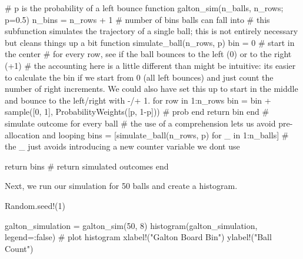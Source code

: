 \documentclass[
  letterpaper,
  DIV=11,
  numbers=noendperiod]{scrartcl}
\newenvironment{Shaded}{\begin{snugshade}}{\end{snugshade}}
\newcommand{\BuiltInTok}[1]{\textcolor[rgb]{0.00,0.23,0.31}{#1}}
\newcommand{\CommentTok}[1]{\textcolor[rgb]{0.37,0.37,0.37}{#1}}
\newcommand{\ConstantTok}[1]{\textcolor[rgb]{0.56,0.35,0.01}{#1}}
\newcommand{\ControlFlowTok}[1]{\textcolor[rgb]{0.00,0.23,0.31}{#1}}
\newcommand{\FloatTok}[1]{\textcolor[rgb]{0.68,0.00,0.00}{#1}}
\newcommand{\FunctionTok}[1]{\textcolor[rgb]{0.28,0.35,0.67}{#1}}
\newcommand{\KeywordTok}[1]{\textcolor[rgb]{0.00,0.23,0.31}{#1}}
\newcommand{\NormalTok}[1]{\textcolor[rgb]{0.00,0.23,0.31}{#1}}
\newcommand{\OperatorTok}[1]{\textcolor[rgb]{0.37,0.37,0.37}{#1}}
\newcommand{\StringTok}[1]{\textcolor[rgb]{0.13,0.47,0.30}{#1}}
\begin{document}
\begin{Shaded}
\begin{Highlighting}[]
\CommentTok{\# p is the probability of a left bounce}
\KeywordTok{function} \FunctionTok{galton\_sim}\NormalTok{(n\_balls, n\_rows; p}\OperatorTok{=}\FloatTok{0.5}\NormalTok{)}
\NormalTok{    n\_bins }\OperatorTok{=}\NormalTok{ n\_rows }\OperatorTok{+} \FloatTok{1} \CommentTok{\# number of bins balls can fall into}
    \CommentTok{\# this subfunction simulates the trajectory of a single ball; this is not entirely necessary but cleans things up a bit}
    \KeywordTok{function} \FunctionTok{simulate\_ball}\NormalTok{(n\_rows, p)}
\NormalTok{        bin }\OperatorTok{=} \FloatTok{0} \CommentTok{\# start in the center}
        \CommentTok{\# for every row, see if the ball bounces to the left (0) or to the right (+1)}
        \CommentTok{\# the accounting here is a little different than might be intuitive: it\textquotesingle{}s easier to calculate the bin if we start from 0 (all left bounces) and just count the number of right increments. We could also have set this up to start in the middle and bounce to the left/right with {-}/+ 1.}
        \ControlFlowTok{for}\NormalTok{ row }\KeywordTok{in} \FloatTok{1}\OperatorTok{:}\NormalTok{n\_rows}
\NormalTok{            bin }\OperatorTok{=}\NormalTok{ bin }\OperatorTok{+} \FunctionTok{sample}\NormalTok{([}\FloatTok{0}\NormalTok{, }\FloatTok{1}\NormalTok{], }\FunctionTok{ProbabilityWeights}\NormalTok{([p, }\FloatTok{1}\OperatorTok{{-}}\NormalTok{p]))  }\CommentTok{\# prob}
        \ControlFlowTok{end}
        \ControlFlowTok{return}\NormalTok{ bin}
    \KeywordTok{end}
    \CommentTok{\# simulate outcome for every ball}
    \CommentTok{\# the use of a comprehension lets us avoid pre{-}allocation and looping}
\NormalTok{    bins }\OperatorTok{=}\NormalTok{ [}\FunctionTok{simulate\_ball}\NormalTok{(n\_rows, p) for \_ }\KeywordTok{in} \FloatTok{1}\OperatorTok{:}\NormalTok{n\_balls] }\CommentTok{\# the \_ just avoids introducing a new counter variable we don\textquotesingle{}t use}

    \ControlFlowTok{return}\NormalTok{ bins }\CommentTok{\# return simulated outcomes}
\KeywordTok{end}
\end{Highlighting}
\end{Shaded}

Next, we run our simulation for 50 balls and create a histogram.

\begin{Shaded}
\begin{Highlighting}[]
\BuiltInTok{Random}\NormalTok{.}\FunctionTok{seed!}\NormalTok{(}\FloatTok{1}\NormalTok{)}

\NormalTok{galton\_simulation }\OperatorTok{=} \FunctionTok{galton\_sim}\NormalTok{(}\FloatTok{50}\NormalTok{, }\FloatTok{8}\NormalTok{)}
\FunctionTok{histogram}\NormalTok{(galton\_simulation, legend}\OperatorTok{=:}\ConstantTok{false}\NormalTok{) }\CommentTok{\# plot histogram}
\FunctionTok{xlabel!}\NormalTok{(}\StringTok{"Galton Board Bin"}\NormalTok{)}
\FunctionTok{ylabel!}\NormalTok{(}\StringTok{"Ball Count"}\NormalTok{)}
\end{Highlighting}
\end{Shaded}
\end{document}
